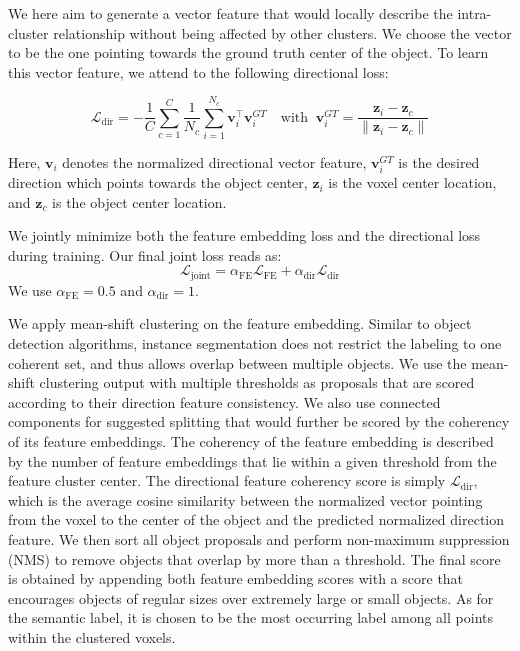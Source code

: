 \documentclass[10pt,twocolumn,letterpaper]{article}
\newcommand{\BG}[1]{}
\newcommand{\boldparagraph}[1]{\vspace{0.5em}\noindent{\bf #1} }
\newcommand{\nLoss}{\mathcal{L}}            \newcommand{\nx}{\mathbf{x}}                \newcommand{\nv}{\mathbf{v}}                \newcommand{\nz}{\mathbf{z}}                \newcommand{\nc}{\boldsymbol{\mu}}
\begin{document}
\boldparagraph{Directional Loss.} We here aim to generate a vector feature that would locally describe the intra-cluster relationship without being affected by other clusters. 
We choose the vector to be the one pointing towards the ground truth center of the object. \BG{you seem to be using object, instance, and cluster interchangeably. It's advised to be consistent with the naming}
To learn this vector feature, we attend to the following  directional loss:




\begin{equation}
  \nLoss_\text{dir} = -\frac{1}{C} \sum_{c=1}^C \frac{1}{N_c} 
                     \sum_{i=1}^{N_c} \nv_i ^{\top} \nv_i^{GT}
  \quad \text{with} \;\;
  \nv_i^{GT} = \frac{\nz_i-\nz_c}{\|\nz_i-\nz_c\|}
\end{equation}


Here, $\nv_i$ denotes the normalized directional vector feature, $\nv_i^{GT}$ is the desired direction which points towards the object center, $\nz_i$ is the voxel center location, and $\nz_c$ is the object center location. 

\boldparagraph{Joint Loss.} We jointly minimize both the feature embedding loss and the directional loss during training. Our final joint loss reads as:
\begin{equation}
   \nLoss_\text{joint} = \alpha_\text{FE}\nLoss_\text{FE} + \alpha_\text{dir}\nLoss_\text{dir}
\end{equation}We use $\alpha_\text{FE} = 0.5$ and $\alpha_\text{dir} = 1$.

\boldparagraph{Post-processing.} 
We apply mean-shift clustering \cite{Fukunaga-Hostetler-TIT-1975} on the feature embedding. Similar to object detection algorithms, instance segmentation does not restrict the labeling to one coherent set, and thus allows overlap between multiple objects.
We use the mean-shift clustering output with multiple thresholds as proposals that are scored according to their direction feature consistency. 
We also use connected components for suggested splitting that would further be scored by the coherency of its feature embeddings. The coherency of the feature embedding is described by the number of feature embeddings that lie within a given threshold from the feature cluster center. The directional feature coherency score is simply $\nLoss_\text{dir}$, which is the average  cosine similarity between the normalized vector pointing from the voxel to the center of the object and the predicted normalized direction feature. We then sort all object proposals and perform non-maximum suppression (NMS) to remove objects that overlap by more than a threshold.
The final score is obtained by appending both feature embedding scores with a score that encourages objects of regular sizes over extremely large or small objects.
As for the semantic label, it is chosen to be the most occurring label among all points within the clustered voxels.
\end{document}
